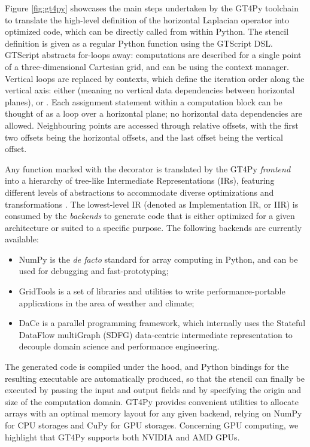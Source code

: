 \documentclass[main.tex]{subfiles}
\begin{document}
        Figure \ref{fig:gt4py} showcases the main steps undertaken by the GT4Py toolchain to translate the high-level definition of the horizontal Laplacian operator into optimized code, which can be directly called from within Python. The stencil definition is given as a regular Python function using the GTScript DSL. GTScript abstracts  for-loops away: computations are described for a single point of a three-dimensional Cartesian grid, and can be  using the  context manager. Vertical loops are replaced by  contexts, which define the iteration order along the vertical axis: either  (meaning no vertical data dependencies between horizontal planes),  or . Each assignment statement within a computation block can be thought of as a loop over a horizontal plane; no horizontal data dependencies are allowed. Neighbouring points are accessed through relative offsets, with the first two offsets being the horizontal offsets, and the last offset being the vertical offset.

        Any function marked with the  decorator is translated by the GT4Py \emph{frontend} into a hierarchy of tree-like Intermediate Representations (IRs), featuring different levels of abstractions to accommodate diverse optimizations and transformations \citep{gysi21}. The lowest-level IR (denoted as Implementation IR, or IIR) is consumed by the \emph{backends} to generate code that is either optimized for a given architecture or suited to a specific purpose. The following backends are currently available:
        \begin{itemize}
            \item NumPy \citep{harris20} is the \emph{de facto} standard for array computing in Python, and can be used for debugging and fast-prototyping;
            \item GridTools \citep{afanasyev21} is a set of libraries and utilities to write performance-portable applications in the area of weather and climate;
            \item DaCe \citep{ben-nun19} is a parallel programming framework, which internally uses the Stateful DataFlow multiGraph (SDFG) data-centric intermediate representation to decouple domain science and performance engineering.
        \end{itemize}
        The generated code is compiled under the hood, and Python bindings for the resulting executable are automatically produced, so that the stencil can finally be executed by passing the input and output fields and by specifying the origin and size of the computation domain. GT4Py provides convenient utilities to allocate arrays with an optimal memory layout for any given backend, relying on NumPy for CPU storages and CuPy \citep{nishino17} for GPU storages. Concerning GPU computing, we highlight that GT4Py supports both NVIDIA and AMD GPUs.
\end{document}
